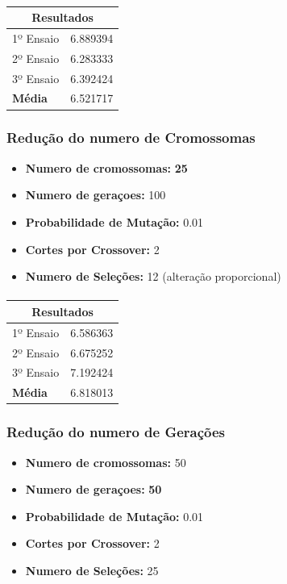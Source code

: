 \documentclass[a4paper]{article}
\begin{document}
\paragraph{}
\begin{center}
	\begin{tabular}{ |l|l| }
		\hline
		\multicolumn{2}{|c|}{Resultados} \\
		\hline
		1º Ensaio & 6.889394 \\
		2º Ensaio & 6.283333 \\
		3º Ensaio & 6.392424 \\
		\textbf{Média} & 6.521717 \\
		\hline
	\end{tabular}
\end{center}

\paragraph{}
\subsubsection{Redução do numero de Cromossomas}
\begin{itemize}
	\item \textbf{Numero de cromossomas:} \textbf{25}
	\item \textbf{Numero de geraçoes:} 100
	\item \textbf{Probabilidade de Mutação:} 0.01
	\item \textbf{Cortes por Crossover:} 2
	\item \textbf{Numero de Seleções:} 12 (alteração proporcional)
\end{itemize}
\paragraph{}
\begin{center}
	\begin{tabular}{ |l|l| }
		\hline
		\multicolumn{2}{|c|}{Resultados} \\
		\hline
		1º Ensaio & 6.586363 \\
		2º Ensaio & 6.675252 \\
		3º Ensaio & 7.192424 \\
		\textbf{Média} & 6.818013 \\
		\hline
	\end{tabular}
\end{center}

\newpage
\subsubsection{Redução do numero de Gerações}
\begin{itemize}
	\item \textbf{Numero de cromossomas:} 50
	\item \textbf{Numero de geraçoes:} \textbf{50}
	\item \textbf{Probabilidade de Mutação:} 0.01
	\item \textbf{Cortes por Crossover:} 2
	\item \textbf{Numero de Seleções:} 25
\end{itemize}
\end{document}
